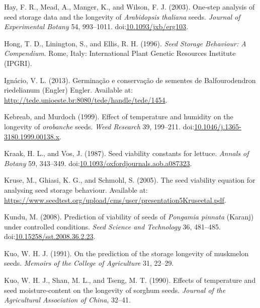 \documentclass[]{article}
\begin{document}
\leavevmode\hypertarget{ref-hay_onestep_2003}{}%
Hay, F. R., Mead, A., Manger, K., and Wilson, F. J. (2003). One‐step
analysis of seed storage data and the longevity of \emph{Arabidopsis
thaliana} seeds. \emph{Journal of Experimental Botany} 54, 993--1011.
doi:\href{https://doi.org/10.1093/jxb/erg103}{10.1093/jxb/erg103}.

\leavevmode\hypertarget{ref-hong_seed_1996}{}%
Hong, T. D., Linington, S., and Ellis, R. H. (1996). \emph{Seed Storage
Behaviour: A Compendium}. Rome, Italy: International Plant Genetic
Resources Institute (IPGRI).

\leavevmode\hypertarget{ref-ignacio_germinacao_2013}{}%
Ignácio, V. L. (2013). Germinação e conservação de sementes de
Balfourodendron riedelianum (Engler) Engler. Available at:
\url{http://tede.unioeste.br:8080/tede/handle/tede/1454}.

\leavevmode\hypertarget{ref-kebreab_effect_1999}{}%
Kebreab, and Murdoch (1999). Effect of temperature and humidity on the
longevity of \emph{orobanche} seeds. \emph{Weed Research} 39, 199--211.
doi:\href{https://doi.org/10.1046/j.1365-3180.1999.00138.x}{10.1046/j.1365-3180.1999.00138.x}.

\leavevmode\hypertarget{ref-kraak_seed_1987}{}%
Kraak, H. L., and Vos, J. (1987). Seed viability constants for lettuce.
\emph{Annals of Botany} 59, 343--349.
doi:\href{https://doi.org/10.1093/oxfordjournals.aob.a087323}{10.1093/oxfordjournals.aob.a087323}.

\leavevmode\hypertarget{ref-kruse_seed_2005}{}%
Kruse, M., Ghiasi, K. G., and Schmohl, S. (2005). The seed viability
equation for analysing seed storage behaviour. Available at:
\url{https://www.seedtest.org/upload/cms/user/presentation5Kruseetal.pdf}.

\leavevmode\hypertarget{ref-kundu_prediction_2008}{}%
Kundu, M. (2008). Prediction of viability of seeds of \emph{Pongamia
pinnata} (Karanj) under controlled conditions. \emph{Seed Science and
Technology} 36, 481--485.
doi:\href{https://doi.org/10.15258/sst.2008.36.2.23}{10.15258/sst.2008.36.2.23}.

\leavevmode\hypertarget{ref-kuo_prediction_1991}{}%
Kuo, W. H. J. (1991). On the prediction of the storage longevity of
muskmelon seeds. \emph{Memoirs of the College of Agriculture} 31,
22--29.

\leavevmode\hypertarget{ref-kuo_effects_1990}{}%
Kuo, W. H. J., Shan, M. L., and Tseng, M. T. (1990). Effects of
temperature and seed moisture-content on the longevity of sorghum seeds.
\emph{Journal of the Agricultural Association of China}, 32--41.
\end{document}
